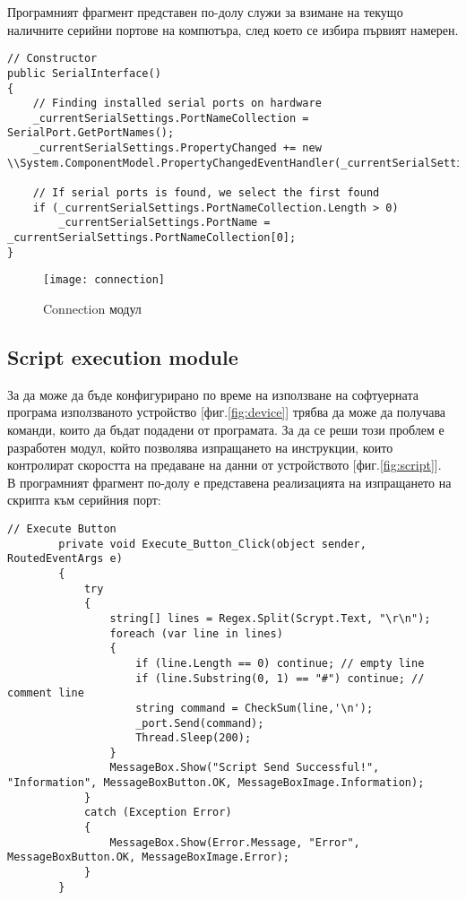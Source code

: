 Програмният фрагмент представен по-долу служи за взимане на текущо наличните серийни портове на компютъра, след което се избира първият намерен.
\begin{lstlisting}
// Constructor
public SerialInterface()
{
    // Finding installed serial ports on hardware
    _currentSerialSettings.PortNameCollection = SerialPort.GetPortNames();
    _currentSerialSettings.PropertyChanged += new \\System.ComponentModel.PropertyChangedEventHandler(_currentSerialSettings_PropertyChanged);

    // If serial ports is found, we select the first found
    if (_currentSerialSettings.PortNameCollection.Length > 0)
        _currentSerialSettings.PortName = _currentSerialSettings.PortNameCollection[0];
}
\end{lstlisting}



\begin{figure}
    \centerline{\texttt{[image: connection]}}
    \caption{Connection модул}
    \label{fig:connection}
\end{figure}

\subsection{Script execution module}
За да може да бъде конфигурирано по време на използване на софтуерната програма използваното устройство [фиг.\ref{fig:device}] трябва да може да получава команди, които да бъдат подадени от програмата. За да се реши този проблем е разработен модул, който позволява изпращането на инструкции, които контролират скоростта на предаване на данни от устройството [фиг.\ref{fig:script}].
\\
В програмният фрагмент по-долу е представена реализацията на изпращането на скрипта към серийния порт:
\begin{lstlisting}
// Execute Button
        private void Execute_Button_Click(object sender, RoutedEventArgs e)
        {
            try
            {
                string[] lines = Regex.Split(Scrypt.Text, "\r\n");
                foreach (var line in lines)
                {                    
                    if (line.Length == 0) continue; // empty line                    
                    if (line.Substring(0, 1) == "#") continue; // comment line
                    string command = CheckSum(line,'\n');
                    _port.Send(command); 
                    Thread.Sleep(200); 
                }
                MessageBox.Show("Script Send Successful!", "Information", MessageBoxButton.OK, MessageBoxImage.Information);
            }
            catch (Exception Error)
            {
                MessageBox.Show(Error.Message, "Error", MessageBoxButton.OK, MessageBoxImage.Error);
            }
        }
\end{lstlisting}





